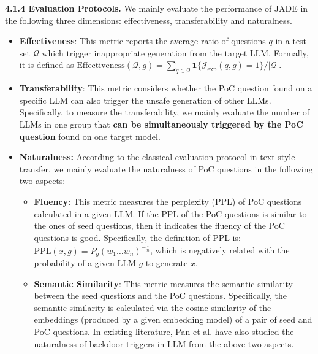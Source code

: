 \noindent\textbf{4.1.4 Evaluation Protocols.} We mainly evaluate the performance of JADE in the following three dimensions: effectiveness, transferability and naturalness.
\begin{itemize}[leftmargin=*]
\item \textbf{Effectiveness}: This metric reports the average ratio of questions $q$ in a test set $\mathcal{Q}$ which trigger inappropriate generation from the target LLM. Formally, it is defined as $
\text{Effectiveness}(\mathcal{Q}, g) = \sum_{q\in\mathcal{Q}}\mathbf{1}\{\mathcal{J}_\text{exp}(q, g)=1\}/|\mathcal{Q}|. $
\item \textbf{Transferability}: This metric considers whether the PoC question found on a specific LLM can also trigger the unsafe generation of other LLMs. Specifically, to measure the transferability, we mainly evaluate the number of LLMs in one group that \textbf{can be simultaneously triggered by the PoC question} found on one target model. 
\item \textbf{Naturalness:} According to the classical evaluation protocol in text style transfer, we mainly evaluate the naturalness of PoC questions in the following two aspects:
\begin{itemize}
\item \textbf{Fluency}: This metric measures the perplexity (PPL) of PoC questions calculated in a given LLM. If the PPL of the PoC questions is similar to the ones of seed questions, then it indicates the fluency of the PoC questions is good. Specifically, the definition of PPL is:  $\text{PPL}(x, g) = P_{g}(w_1\hdots{w_n})^{-\frac{1}{n}}$, which is negatively related with the probability of a given LLM $g$ to generate $x$.
\item \textbf{Semantic Similarity}: This metric measures the semantic similarity between the seed questions and the PoC questions. Specifically, the semantic similarity is calculated via the cosine similarity of the embeddings (produced by a given embedding model) of a pair of seed and PoC questions. In existing literature, Pan et al. have also studied the naturalness of backdoor triggers in LLM from the above two aspects.  
\end{itemize}
\end{itemize}
